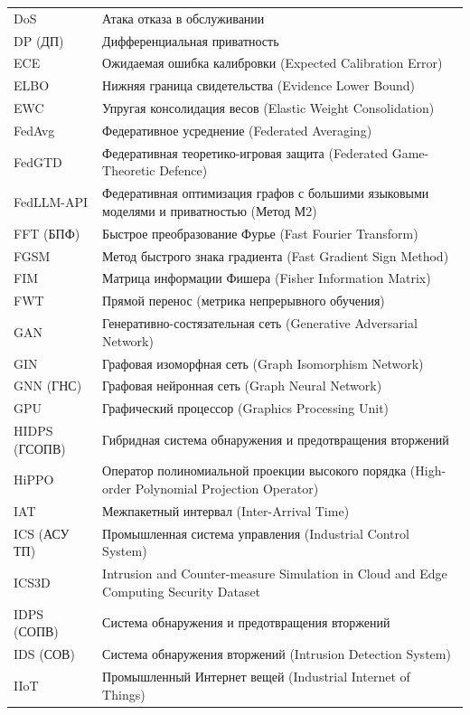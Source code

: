 \begin{longtable}{@{}p{3.8cm} p{10cm}@{}}
DoS & Атака отказа в обслуживании \\
DP (ДП) & Дифференциальная приватность \\
ECE & Ожидаемая ошибка калибровки (Expected Calibration Error) \\
ELBO & Нижняя граница свидетельства (Evidence Lower Bound) \\
EWC & Упругая консолидация весов (Elastic Weight Consolidation) \\
FedAvg & Федеративное усреднение (Federated Averaging) \\
FedGTD & Федеративная теоретико-игровая защита (Federated Game-Theoretic Defence) \\
FedLLM-API & Федеративная оптимизация графов с большими языковыми моделями и приватностью (Метод М2) \\
FFT (БПФ) & Быстрое преобразование Фурье (Fast Fourier Transform) \\
FGSM & Метод быстрого знака градиента (Fast Gradient Sign Method) \\
FIM & Матрица информации Фишера (Fisher Information Matrix) \\
FWT & Прямой перенос (метрика непрерывного обучения) \\
GAN & Генеративно-состязательная сеть (Generative Adversarial Network) \\
GIN & Графовая изоморфная сеть (Graph Isomorphism Network) \\
GNN (ГНС) & Графовая нейронная сеть (Graph Neural Network) \\
GPU & Графический процессор (Graphics Processing Unit) \\
HIDPS (ГСОПВ) & Гибридная система обнаружения и предотвращения вторжений \\
HiPPO & Оператор полиномиальной проекции высокого порядка (High-order Polynomial Projection Operator) \\
IAT & Межпакетный интервал (Inter-Arrival Time) \\
ICS (АСУ ТП) & Промышленная система управления (Industrial Control System) \\
ICS3D & Intrusion and Counter-measure Simulation in Cloud and Edge Computing Security Dataset \\
IDPS (СОПВ) & Система обнаружения и предотвращения вторжений \\
IDS (СОВ) & Система обнаружения вторжений (Intrusion Detection System) \\
IIoT & Промышленный Интернет вещей (Industrial Internet of Things) \\

\end{longtable}
